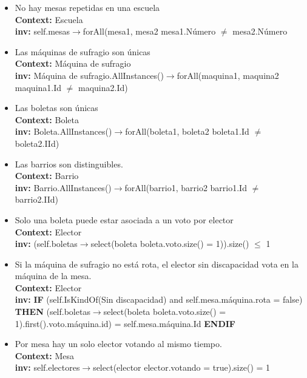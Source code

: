 \documentclass[spanish, 10pt,a4paper]{article}
\numberwithin{equation}{section} %
\begin{document}
\begin{itemize}
	\item No hay mesas repetidas en una escuela
\\	\textbf{Context: }  Escuela
\\	\textbf{inv: } self.mesas$\rightarrow$forAll(mesa1, mesa2 \textbar mesa1.Número $\neq$ mesa2.Número

	\item Las máquinas de sufragio son únicas
\\	\textbf{Context: }  Máquina de sufragio
\\	\textbf{inv: } Máquina de sufragio.AllInstances()$\rightarrow$forAll(maquina1, maquina2 \textbar maquina1.Id $\neq$ maquina2.Id)

	\item Las boletas son únicas
\\	\textbf{Context: }  Boleta
\\	\textbf{inv: } Boleta.AllInstances()$\rightarrow$forAll(boleta1, boleta2 \textbar boleta1.Id $\neq$ boleta2.IId)

	\item Las barrios son distinguibles.
\\	\textbf{Context: }  Barrio
\\	\textbf{inv: } Barrio.AllInstances()$\rightarrow$forAll(barrio1, barrio2 \textbar barrio1.Id $\neq$ barrio2.IId)

	\item Solo una boleta puede estar asociada a un voto por elector
\\	\textbf{Context: }  Elector
\\	\textbf{inv: } (self.boletas$\rightarrow$select(boleta \textbar boleta.voto.size() = 1)).size()  $\leq$ 1

	\item Si la máquina de sufragio no está rota, el elector sin discapacidad vota en la máquina de la mesa.
\\	\textbf{Context: }  Elector
\\	\textbf{inv: } \textbf{IF} (self.IsKindOf(Sin discapacidad) and self.mesa.máquina.rota = false) \textbf{THEN} (self.boletas$\rightarrow$select(boleta \textbar boleta.voto.size() = 1).first().voto.máquina.id) = self.mesa.máquina.Id \textbf{ENDIF}

	\item Por mesa hay un solo elector votando al mismo tiempo.
\\	\textbf{Context: }  Mesa
\\	\textbf{inv: } self.electores$\rightarrow$select(elector \textbar elector.votando = true).size() = 1
	

\end{itemize}
\end{document}
